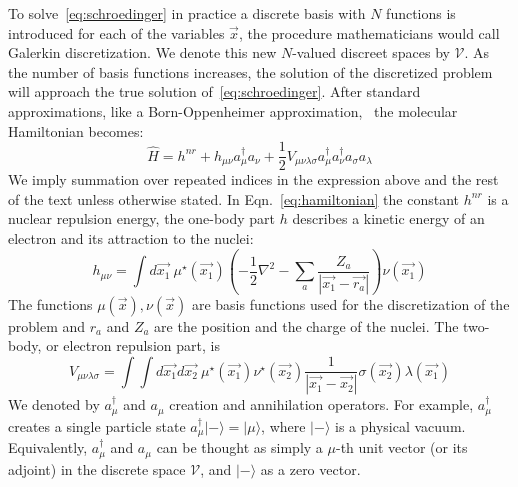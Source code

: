 To solve~\ref{eq:schroedinger} in practice a discrete basis with $N$ 
functions is introduced for each of the variables $\vec{x}$, the procedure 
mathematicians would call Galerkin discretization. We denote this new 
$N$-valued discreet spaces by $\mathcal{V}$. As the number of basis functions 
increases, the solution of the discretized problem will approach the true 
solution of~\ref{eq:schroedinger}. After standard approximations, like a 
Born-Oppenheimer approximation,~\cite{} the molecular Hamiltonian becomes:
%
\begin{equation}
 \hat{H} = h^{nr} + h_{\mu \nu} a^{\dagger}_{\mu} a_{\nu} + \frac{1}{2} V_{\mu 
\nu \lambda \sigma} a^{\dagger}_{\mu} a^{\dagger}_{\nu} a_{\sigma} a_{\lambda}
\label{eq:hamiltonian}
\end{equation}
%
We imply summation over repeated indices in the expression above and the rest 
of the text unless otherwise stated. In Eqn.~\ref{eq:hamiltonian} the constant 
$h^{nr}$ is a nuclear repulsion energy, the one-body part $h$ describes a 
kinetic energy of an electron and its attraction to the nuclei:
%
\begin{equation}
 h_{\mu \nu} = \int d\vec{x_{1}} ~ \mu^{\star}(\vec{x_{1}}) \left( - 
\frac{1}{2} \nabla^2 - \sum_{a} \frac{Z_{a}}{|\vec{x_{1}} - 
\vec{r_{a}}|} \right) \nu(\vec{x_{1}})
\end{equation}
% 
The functions $\mu(\vec{x}), \nu(\vec{x})$ are basis functions used for the 
discretization of the problem and $r_{a}$ and $Z_{a}$ are the 
position and the charge of the nuclei. The two-body, or electron repulsion 
part, is
%
\begin{equation}
 V_{\mu \nu \lambda \sigma} = \int \int d\vec{x_{1}} d\vec{x_{2}}~ 
\mu^{\star}(\vec{x_{1}}) \nu^{\star}(\vec{x_{2}}) 
\frac{1}{|\vec{x_{1}} - \vec{x_{2}}|} 
\sigma(\vec{x_{2}}) \lambda(\vec{x_{1}}) 
\end{equation}
% 
We denoted by $a^{\dagger}_{\mu}$ and $a_{\mu}$ creation and 
annihilation operators. For example, $a^{\dagger}_{\mu}$ creates a single 
particle state $a^{\dagger}_{\mu} | - \rangle = | \mu \rangle$, where $| - 
\rangle$ is a physical vacuum. Equivalently, $a^{\dagger}_{\mu}$ and $a_{\mu}$ 
can be thought as simply a $\mu$-th unit vector (or its adjoint) in the 
discrete space $\mathcal{V}$, and $| - \rangle$  as a zero vector.

